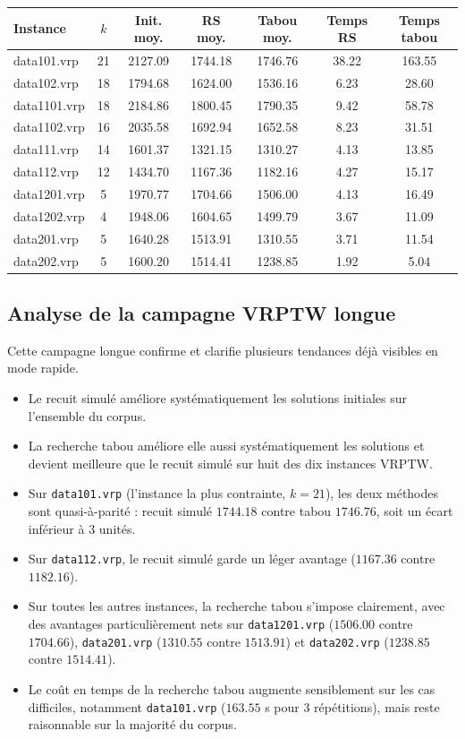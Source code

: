 \documentclass[11pt,a4paper]{article}
\begin{document}
\begin{center}
\begin{tabular}{lcccccc}
\toprule
Instance & \(k\) & Init. moy. & RS moy. & Tabou moy. & Temps RS & Temps tabou \\
\midrule
data101.vrp  & 21 & 2127.09 & 1744.18 & 1746.76 & 38.22 & 163.55 \\
data102.vrp  & 18 & 1794.68 & 1624.00 & 1536.16 & 6.23  & 28.60  \\
data1101.vrp & 18 & 2184.86 & 1800.45 & 1790.35 & 9.42  & 58.78  \\
data1102.vrp & 16 & 2035.58 & 1692.94 & 1652.58 & 8.23  & 31.51  \\
data111.vrp  & 14 & 1601.37 & 1321.15 & 1310.27 & 4.13  & 13.85  \\
data112.vrp  & 12 & 1434.70 & 1167.36 & 1182.16 & 4.27  & 15.17  \\
data1201.vrp & 5  & 1970.77 & 1704.66 & 1506.00 & 4.13  & 16.49  \\
data1202.vrp & 4  & 1948.06 & 1604.65 & 1499.79 & 3.67  & 11.09  \\
data201.vrp  & 5  & 1640.28 & 1513.91 & 1310.55 & 3.71  & 11.54  \\
data202.vrp  & 5  & 1600.20 & 1514.41 & 1238.85 & 1.92  & 5.04   \\
\bottomrule
\end{tabular}
\end{center}

\subsection{Analyse de la campagne VRPTW longue}
Cette campagne longue confirme et clarifie plusieurs tendances déjà visibles en mode rapide.

\begin{itemize}
    \item Le recuit simulé améliore systématiquement les solutions initiales sur l'ensemble du corpus.
    \item La recherche tabou améliore elle aussi systématiquement les solutions et devient meilleure que le recuit simulé sur huit des dix instances VRPTW.
    \item Sur \texttt{data101.vrp} (l'instance la plus contrainte, \(k=21\)), les deux méthodes sont quasi-à-parité : recuit simulé \(1744.18\) contre tabou \(1746.76\), soit un écart inférieur à \(3\) unités.
    \item Sur \texttt{data112.vrp}, le recuit simulé garde un léger avantage (\(1167.36\) contre \(1182.16\)).
    \item Sur toutes les autres instances, la recherche tabou s'impose clairement, avec des avantages particulièrement nets sur \texttt{data1201.vrp} (\(1506.00\) contre \(1704.66\)), \texttt{data201.vrp} (\(1310.55\) contre \(1513.91\)) et \texttt{data202.vrp} (\(1238.85\) contre \(1514.41\)).
    \item Le coût en temps de la recherche tabou augmente sensiblement sur les cas difficiles, notamment \texttt{data101.vrp} (\(163.55\) s pour 3 répétitions), mais reste raisonnable sur la majorité du corpus.
\end{itemize}
\end{document}
